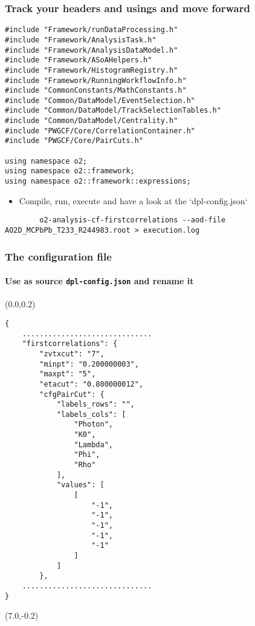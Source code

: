 \documentclass[14pt,aspectratio=169,t]{beamer}
\begin{document}
\begin{frame}[fragile]
  \frametitle{Track your headers and usings and move forward}
  \vspace{-0.15in}
  {\scriptsize\color{blue}
  \begin{verbatim}
#include "Framework/runDataProcessing.h"
#include "Framework/AnalysisTask.h"
#include "Framework/AnalysisDataModel.h"
#include "Framework/ASoAHelpers.h"
#include "Framework/HistogramRegistry.h"
#include "Framework/RunningWorkflowInfo.h"
#include "CommonConstants/MathConstants.h"
#include "Common/DataModel/EventSelection.h"
#include "Common/DataModel/TrackSelectionTables.h"
#include "Common/DataModel/Centrality.h"
#include "PWGCF/Core/CorrelationContainer.h"
#include "PWGCF/Core/PairCuts.h"

using namespace o2;
using namespace o2::framework;
using namespace o2::framework::expressions;
  \end{verbatim}}
  \vspace{-0.2in}
  \begin{itemize}
    \small
    \item Compile, run, execute and have a look at the `dpl-config.json`
  \end{itemize}
  {\tiny \color{black}
  \vspace{-0.1in}
  \begin{verbatim}
        o2-analysis-cf-firstcorrelations --aod-file AO2D_MCPbPb_T233_R244983.root > execution.log
  \end{verbatim}}
\end{frame}

\begin{frame}[fragile]
  \frametitle{The configuration file}
  \framesubtitle{Use as source \texttt{dpl-config.json} and rename it}
  \begin{textblock}{6}(0.0,0.2)
    {\tiny\color{blue}
    \vspace{-0.0in}
    \begin{verbatim}
{
    ..............................
    "firstcorrelations": {
        "zvtxcut": "7",
        "minpt": "0.200000003",
        "maxpt": "5",
        "etacut": "0.800000012",
        "cfgPairCut": {
            "labels_rows": "",
            "labels_cols": [
                "Photon",
                "K0",
                "Lambda",
                "Phi",
                "Rho"
            ],
            "values": [
                [
                    "-1",
                    "-1",
                    "-1",
                    "-1",
                    "-1"
                ]
            ]
        },
    ..............................
}    
    \end{verbatim}}
  \end{textblock}
  \begin{textblock}{6}(7.0,-0.2)
    {\tiny\color{blue}
    \vspace{-0.0in}
    \begin{verbatim}
    \end{verbatim}}
  \end{textblock}
\end{frame}
\end{document}
